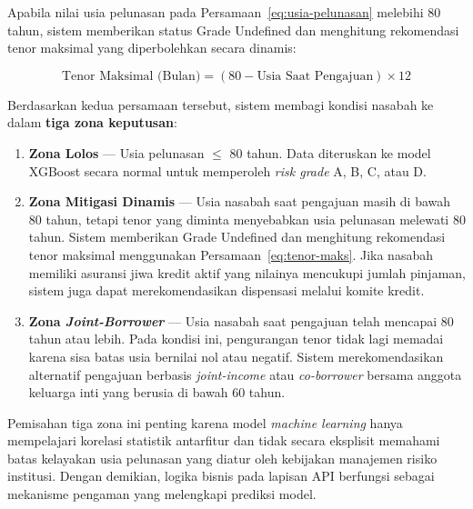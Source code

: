 Apabila nilai usia pelunasan pada Persamaan~\ref{eq:usia-pelunasan} melebihi 80 tahun, sistem memberikan status Grade Undefined dan menghitung rekomendasi tenor maksimal yang diperbolehkan secara dinamis:

\begin{equation}
    \text{Tenor Maksimal (Bulan)} = (80 - \text{Usia Saat Pengajuan}) \times 12
    \label{eq:tenor-maks}
\end{equation}

Berdasarkan kedua persamaan tersebut, sistem membagi kondisi nasabah ke dalam \textbf{tiga zona keputusan}:

\begin{enumerate}
    \item \textbf{Zona Lolos} --- Usia pelunasan $\leq$ 80 tahun. Data diteruskan ke model XGBoost secara normal untuk memperoleh \textit{risk grade} A, B, C, atau D.
    \item \textbf{Zona Mitigasi Dinamis} --- Usia nasabah saat pengajuan masih di bawah 80 tahun, tetapi tenor yang diminta menyebabkan usia pelunasan melewati 80 tahun. Sistem memberikan Grade Undefined dan menghitung rekomendasi tenor maksimal menggunakan Persamaan~\ref{eq:tenor-maks}. Jika nasabah memiliki asuransi jiwa kredit aktif yang nilainya mencukupi jumlah pinjaman, sistem juga dapat merekomendasikan dispensasi melalui komite kredit.
    \item \textbf{Zona \textit{Joint-Borrower}} --- Usia nasabah saat pengajuan telah mencapai 80 tahun atau lebih. Pada kondisi ini, pengurangan tenor tidak lagi memadai karena sisa batas usia bernilai nol atau negatif. Sistem merekomendasikan alternatif pengajuan berbasis \textit{joint-income} atau \textit{co-borrower} bersama anggota keluarga inti yang berusia di bawah 60 tahun.
\end{enumerate}

Pemisahan tiga zona ini penting karena model \textit{machine learning} hanya mempelajari korelasi statistik antarfitur dan tidak secara eksplisit memahami batas kelayakan usia pelunasan yang diatur oleh kebijakan manajemen risiko institusi. Dengan demikian, logika bisnis pada lapisan API berfungsi sebagai mekanisme pengaman yang melengkapi prediksi model.


